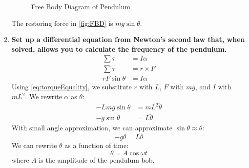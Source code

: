 \documentclass[article, 12pt]{article}
\begin{document}
\begin{enumerate}[1)]
\begin{figure}[H]
        \caption{Free Body Diagram of Pendulum}
        \label{fig:FBD}
    \end{figure}
    The restoring force in \autoref{fig:FBD} is $mg\sin{\theta}$.
    \item \textbf{Set up a differential equation from Newton's second law that, when solved, allows you to calculate the frequency of the pendulum.} \label{q:diffRotation} \\
    \begin{align}
        \sum \tau &= I\alpha \nonumber \\
        \sum \tau &= r \times F \nonumber \\
        rF\sin{\theta} &= I\alpha
        \label{eq:torqueEquality}
    \end{align}
    Using \autoref{eq:torqueEquality}, we substitute $r$ with $L$, $F$ with $mg$, and $I$ with $mL^2$. We rewrite $\alpha$ as $\ddot{\theta}$:
    \begin{align}
        -Lmg\sin{\theta} &= mL^2\ddot{\theta} \nonumber \\
        -g\sin{\theta} &= L\ddot{\theta}
    \end{align}
    With small angle approximation, we can approximate $\sin{\theta} \approx \theta$:
    \begin{equation}
        -g\theta = L\ddot{\theta}
        \label{eq:torqueSmallAngleApprox}
    \end{equation}
    We can rewrite $\theta$ as a function of time:
    \begin{equation}
        \theta = A\cos{\omega t}
        \label{eq:theta}
    \end{equation}
    where $A$ is the amplitude of the pendulum bob.
    

\end{enumerate}
\end{document}

